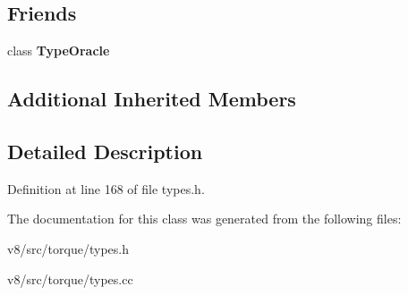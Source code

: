 \subsection*{Friends}
\begin{DoxyCompactItemize}
\item 
\mbox{\label{classv8_1_1internal_1_1torque_1_1AbstractType_a7094142f1d9b95b74797a11decbf23e3}} 
class {\bfseries Type\+Oracle}
\end{DoxyCompactItemize}
\subsection*{Additional Inherited Members}


\subsection{Detailed Description}


Definition at line 168 of file types.\+h.



The documentation for this class was generated from the following files\+:\begin{DoxyCompactItemize}
\item 
v8/src/torque/types.\+h\item 
v8/src/torque/types.\+cc\end{DoxyCompactItemize}
